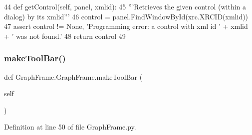 \begin{DoxyCode}
44     \textcolor{keyword}{def }getControl(self, panel, xmlid):
45         \textcolor{stringliteral}{'''Retrieves the given control (within a dialog) by its xmlid'''}
46         control = panel.FindWindowById(xrc.XRCID(xmlid))
47         \textcolor{keyword}{assert} control != \textcolor{keywordtype}{None}, \textcolor{stringliteral}{'Programming error: a control with xml id '} + xmlid + \textcolor{stringliteral}{' was not found.'}
48         \textcolor{keywordflow}{return} control
49         
\end{DoxyCode}
\mbox{\label{classGraphFrame_1_1GraphFrame_a63903bf4616f8d1d7602dfb86c123654}} 
\subsubsection{\texorpdfstring{make\+Tool\+Bar()}{makeToolBar()}}
{\footnotesize\ttfamily def Graph\+Frame.\+Graph\+Frame.\+make\+Tool\+Bar (\begin{DoxyParamCaption}\item[{}]{self }\end{DoxyParamCaption})}



Definition at line 50 of file Graph\+Frame.\+py.


